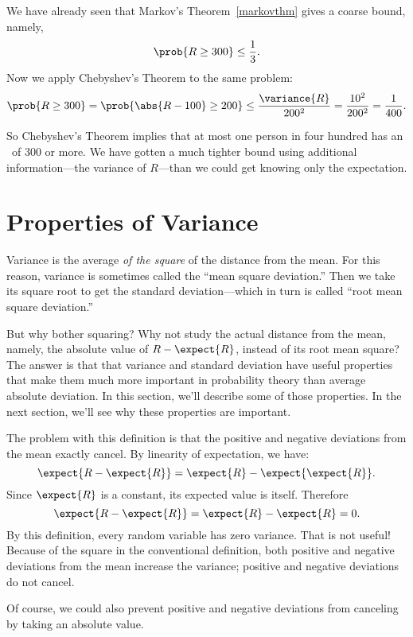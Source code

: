 We have already seen that Markov's Theorem~\ref{markovthm} gives a coarse
bound, namely,
\[
  \prob{R \geq 300} \leq \frac{1}{3}.
\]
Now we apply Chebyshev's Theorem to the same problem:
\[
\prob{R \geq 300} = \prob{\abs{R - 100} \geq 200} \leq
\frac{\variance{R}}{200^2} = \frac{10^2}{200^2} = \frac{1}{400}.
\]
\iffalse
The purpose of the first step is to express the desired probability in the
form required by Chebyshev's Theorem; the equality holds because $R$ is
nonnegative.  Chebyshev's Theorem then yields the inequality.\fi

So Chebyshev's Theorem implies that at most one person in four hundred
has an \IQ\ of 300 or more.  We have gotten a much tighter bound using
additional information---the variance of $R$---than we could get
knowing only the expectation.

\section{Properties of Variance}\label{variance_sec}
Variance is the average \emph{of the square} of the distance from the
mean.  For this reason, variance is sometimes called the ``mean square
deviation.''  Then we take its square root to get the standard
deviation---which in turn is called ``root mean square deviation.''

But why bother squaring?  Why not study the actual distance from the
mean, namely, the absolute value of $R - \expect{R}$, instead of its
root mean square?  The answer is that that variance and standard
deviation have useful properties that make them much more important in
probability theory than average absolute deviation.  In this section,
we'll describe some of those properties.  In the next section, we'll
see why these properties are important.

\iffalse
Focus on the variance and standard deviation of $R$ may seem a little
unexpected.  After all, these definitions arose from asking about the
probability that the absolute deviation, $\abs{R - \expect{R}}$, was
large.  To get a better grip on the probability of deviation, we
squared it to get the Chebyshev Bound, this led us to the convoluted
concept of root mean square deviation.
\fi

\begin{editingnotes}
The problem with this definition is that the positive and negative
deviations from the mean exactly cancel.  By linearity of expectation,
we have:
\[
  \expect{R - \expect{R}} = \expect{R} - \expect{\expect{R}}.
\]
Since $\expect{R}$ is a constant, its expected value is itself. Therefore
\[
\expect{R - \expect{R}} = \expect{R} - \expect{R} = 0.
\]
By this definition, every random variable has zero variance.  That is not
useful!  Because of the square in the conventional definition, both
positive and negative deviations from the mean increase the variance;
positive and negative deviations do not cancel.

Of course, we could also prevent positive and negative deviations from
canceling by taking an absolute value.
\end{editingnotes}

